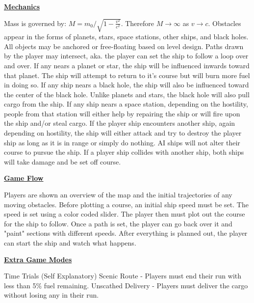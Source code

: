 \documentclass[archE1,portrait]{baposter}
\begin{document}
\begin{poster}
{
	\underline{\textbf{Mechanics}}
	\begin{outline}
		\1 Mass is governed by: $M = m_0/\sqrt{1-\frac{v^2}{c^2}}$.
			\2 Therefore $M\rightarrow\infty$ as $v\rightarrow c$.
		\1 Obstacles appear in the forms of planets, stars, space stations, other ships, and black holes.
			\2 All objects may be anchored or free-floating based on level design.
		\1 Paths drawn by the player may intersect, aka. the player can set the ship to follow a loop over and over.
		\1 If any nears a planet or star, the ship will be influenced inwards toward that planet.
			\2 The ship will attempt to return to it's course but will burn more fuel in doing so.
		\1 If any ship nears a black hole, the ship will also be influenced toward the center of the black hole. 
			\2 Unlike planets and stars, the black hole will also pull cargo from the ship.
		\1 If any ship nears a space station, depending on the hostility, people from that station will either help by repairing the ship or will fire upon the ship and/or steal cargo.
		\1 If the player ship encounters another ship, again depending on hostility, the ship will either attack and try to destroy the player ship as long as it is in range or simply do nothing.
			\2 AI ships will not alter their course to pursue the ship.
			\2 If a player ship collides with another ship, both ships will take damage and be set off course.
	\end{outline}

	\underline{\textbf{Game Flow}}
	\begin{outline}
		\1 Players are shown an overview of the map and the initial trajectories of any moving obstacles.
		\1 Before plotting a course, an initial ship speed must be set.
			\2 The speed is set using a color coded slider.
		\1 The player then must plot out the course for the ship to follow.
			\2 Once a path is set, the player can go back over it and "paint" sections with different speeds.
		\1 After everything is planned out, the player can start the ship and watch what happens. 
	\end{outline}
	
	\underline{\textbf{Extra Game Modes}}
	\begin{outline}
		\1 Time Trials (Self Explanatory)
		\1 Scenic Route - Players must end their run with less than 5\% fuel remaining.
		\1 Unscathed Delivery - Players must deliver the cargo without losing any in their run.
	\end{outline}
}


\end{poster}
\end{document}
